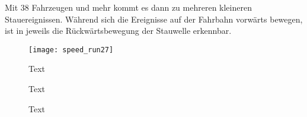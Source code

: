 Mit 38 Fahrzeugen und mehr kommt es dann zu mehreren kleineren Stauereignissen.
Während sich die Ereignisse auf der Fahrbahn vorwärts bewegen, ist in jeweils die Rückwärtsbewegung der Stauwelle erkennbar.






\begin{figure}[hptb]
 \centering
 \texttt{[image: speed\_run27]}
 \caption[kurzText]
 		{Text}
 \label{figure:image1}
\end{figure}


\begin{figure}[hptb]
  \centering 
   \qquad 
     \caption{Text} 
  \label{figure:image2}
\end{figure}


\begin{figure}[hptb]
  \centering 
   \qquad 
   \qquad 
  \caption{Text} 
  \label{figure:image3}
\end{figure}

